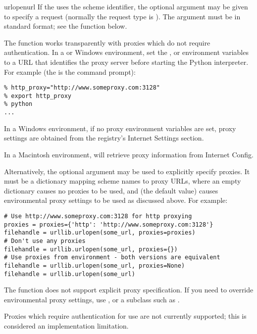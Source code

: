 \begin{funcdesc}{urlopen}{url}
If the  uses the  scheme identifier, the optional
 argument may be given to specify a  request
(normally the request type is ).  The  argument
must be in standard  format;
see the  function below.

The  function works transparently with proxies
which do not require authentication.  In a \UNIX{} or Windows
environment, set the ,  or
 environment variables to a URL that identifies
the proxy server before starting the Python interpreter.  For example
(the \character{\%} is the command prompt):

\begin{verbatim}
% http_proxy="http://www.someproxy.com:3128"
% export http_proxy
% python
...
\end{verbatim}

In a Windows environment, if no proxy environment variables are set,
proxy settings are obtained from the registry's Internet Settings
section.

In a Macintosh environment,  will retrieve proxy
information from Internet Config.

Alternatively, the optional  argument may be used to
explicitly specify proxies.  It must be a dictionary mapping scheme
names to proxy URLs, where an empty dictionary causes no proxies to be
used, and  (the default value) causes environmental proxy
settings to be used as discussed above.  For example:

\begin{verbatim}
# Use http://www.someproxy.com:3128 for http proxying
proxies = proxies={'http': 'http://www.someproxy.com:3128'}
filehandle = urllib.urlopen(some_url, proxies=proxies)
# Don't use any proxies
filehandle = urllib.urlopen(some_url, proxies={})
# Use proxies from environment - both versions are equivalent
filehandle = urllib.urlopen(some_url, proxies=None)
filehandle = urllib.urlopen(some_url)
\end{verbatim}

The  function does not support explicit proxy
specification.  If you need to override environmental proxy settings,
use , or a subclass such as .

Proxies which require authentication for use are not currently
supported; this is considered an implementation limitation.

\end{funcdesc}

